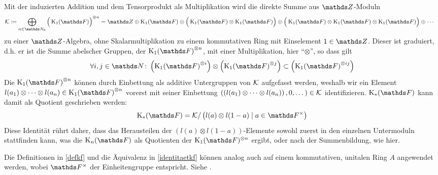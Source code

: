 \documentclass[ngerman,fontsize=11pt, paper=a4, parskip=half, titlepage=true, toc=bib]{scrartcl}
\begin{document}
\begin{Bem}\label{identitaetkf}
  Mit der induzierten Addition und dem Tensorprodukt als
  Multiplikation wird die direkte Summe aus $\Z$-Moduln
  \begin{align*}
    \calK &\coloneqq
            \bigoplus_{n\in\N_0}{\Big(\K_1(\F)\Big)}^{\otimes n}%
            = \Z\oplus\K_1(\F)
            \oplus\Big(\K_1(\F)\otimes\K_1(\F)\Big)
            \oplus\Big(\K_1(\F)\otimes\K_1(\F)\otimes\K_1(\F)\Big)
            \oplus\dotsb
  \end{align*}
  zu einer $\Z$-Algebra, 
  ohne Skalarmultiplikation zu einem kommutativen Ring mit Einselement
  $1\in\Z$.
  Dieser ist graduiert, d.h. er ist die Summe abelscher Gruppen, 
  der ${\K_1(\F)}^{\otimes n}$, mit einer Multiplikation, hier
  \enquote{$\otimes$}, so dass gilt
  \begin{gather*}
    \forall i,j\in \N\colon 
    \left( {\K_1(\F)}^{\otimes i} \right) \otimes
    \left( {\K_1(\F)}^{\otimes j} \right)
    \subset \left( {\K_1(\F)}^{\otimes ij} \right)
  \end{gather*}
  Die ${\KoF}^{\otimes n}$ können durch Einbettung als additive 
  Untergruppen von $\mathcal{K}$ aufgefasst
  werden, weshalb wir ein Element
  $l(a_1)\otimes\dotsb\otimes l(a_n)\in {\KoF}^{\otimes n}$
  vorerst mit seiner Einbettung
  $\left(
    \left(l(a_1)\otimes\dotsb\otimes l(a_n)\right),
    0,\dotsc
  \right)\in\mathcal{K}$
  identifizieren.
  $\KF$ kann damit als Quotient geschrieben werden:
  \begin{gather*}
    \KF = \calK / \left(l(a)\otimes l(1-a)\mid a\in\Fx\right)
  \end{gather*}
  Diese Identität rührt daher, dass das Herausteilen 
  der $(l(a)\otimes l(1-a))$-Elemente sowohl zuerst in den einzelnen
  Untermoduln stattfinden kann, was die $\KnF$ als Quotienten der
  $\KoF^{\otimes n}$ ergibt, 
  oder nach der Summenbildung, wie hier.
\end{Bem}

\begin{Bem}
  Die Definitionen in \ref{defkf} und die Äquivalenz in 
  \ref{identitaetkf} können analog auch auf 
  einem kommutativen, unitalen Ring $A$ angewendet werden,
  wobei $\Fx$ der Einheitengruppe entspricht. Siehe \cite{kerzdipl,kerz}.
\end{Bem}
\end{document}
